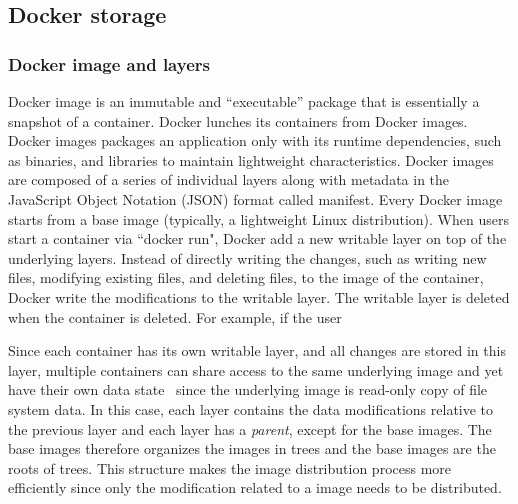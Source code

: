 \subsection{Docker storage}

\subsubsection{Docker image and layers}
\label{sec-image-layers}
Docker image is an immutable and ``executable'' package that is essentially a
snapshot of a container. Docker lunches its containers from Docker images.
%
%
Docker images packages an application only with its runtime dependencies, such as
binaries, and libraries to maintain lightweight characteristics. Docker images are
composed of a series of individual layers along with metadata in the JavaScript
Object Notation (JSON) format called manifest. Every Docker image starts from a
base image (typically, a lightweight Linux distribution). When users start a
container via ``docker run", Docker add a new writable layer on top of the
underlying layers. Instead of directly writing the changes, such as writing new
files, modifying existing files, and deleting files, to the image of the container,
Docker write the modifications to the writable layer. The writable layer is deleted
when the container is deleted. For example, if the user

 

Since each container has its own writable layer, and all changes are stored in this
layer, multiple containers can share access to the same underlying image and yet
have their own data state~\cite{xxx} since the underlying image is read-only copy
of file system data. In this case, each layer contains the data modifications
relative to the previous layer and each layer has a \textit{parent}, except for
the base images. The base images therefore organizes the images in trees and the
base images are the roots of trees. This structure makes the image distribution
process more efficiently since only the modification related to a image needs to
be distributed.

%
%
%



